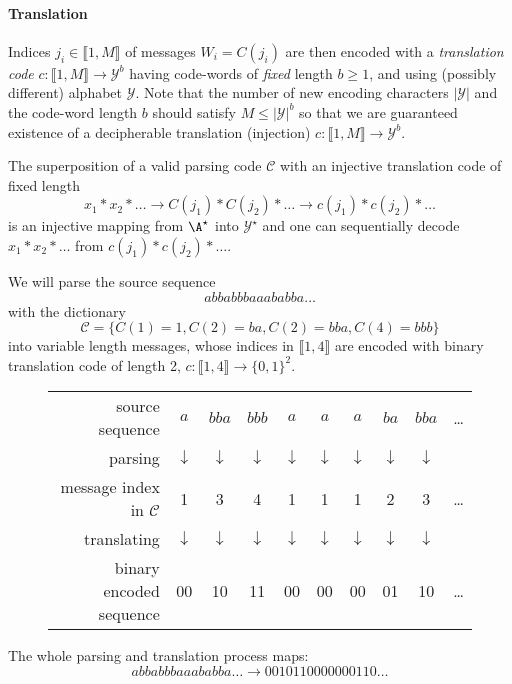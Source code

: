 \documentclass[toc]{../cs-classes/cs-classes}
\begin{document}
\paragraph*{Translation} Indices $j_i\in\llbracket 1, M\rrbracket$ of messages $W_i = C(j_i)$ are then encoded with a \emph{translation code} $c:\llbracket 1, M\rrbracket\to \mathcal{Y}^b$ having code-words of \emph{fixed} length $b\geq1$, and using (possibly different) alphabet $\mathcal{Y}$. Note that the number of new encoding characters $|\mathcal{Y}|$ and the code-word length $b$ should satisfy $M\leq|\mathcal{Y}|^b$ so that we are guaranteed existence of a decipherable translation (injection) $c:\llbracket 1, M\rrbracket\to\mathcal{Y}^b$.

The superposition of a valid parsing code $\mathcal{C}$ with an injective translation code of fixed length
\begin{equation*}
    x_1*x_2*\dots \longrightarrow C(j_1)*C(j_2)*\dots \longrightarrow c(j_1)*c(j_2)*\dots
\end{equation*}
is an injective mapping from $\A^\star$ into $\mathcal{Y}^\star$ and one can sequentially decode $x_1*x_2*\dots$ from $c(j_1)*c(j_2)*\dots$.

\begin{example}
    We will parse the source sequence
    \begin{equation*}
        abbabbbaaababba\dots
    \end{equation*}
    with the dictionary
    \begin{equation*}
        \mathcal{C} = \{C(1) = 1, C(2)=ba, C(2)=bba, C(4)=bbb\}
    \end{equation*}
    into variable length messages, whose indices in $\llbracket 1, 4\rrbracket$ are encoded with binary translation code of length 2, $c:\llbracket 1, 4\rrbracket \to \{0, 1\}^2$.

    \begin{figure}[!ht]
        \centering
        \renewcommand{\arraystretch}{1.3}
        \begin{tabular}{r c c c c c c c c c}
            source sequence&$a$&$bba$&$bbb$&$a$&$a$&$a$&$ba$&$bba$&\dots\\
            parsing&$\downarrow$&$\downarrow$&$\downarrow$&$\downarrow$&$\downarrow$&$\downarrow$&$\downarrow$&$\downarrow$\\
            message index in $\mathcal{C}$&1&3&4&1&1&1&2&3&\dots\\
            translating&$\downarrow$&$\downarrow$&$\downarrow$&$\downarrow$&$\downarrow$&$\downarrow$&$\downarrow$&$\downarrow$\\
            binary encoded sequence&00&10&11&00&00&00&01&10&\dots
        \end{tabular}
    \end{figure}

    The whole parsing and translation process maps:
    \begin{equation*}
        abbabbbaaababba\dots \longrightarrow 0010110000000110\dots
    \end{equation*}
\end{example}
\end{document}
